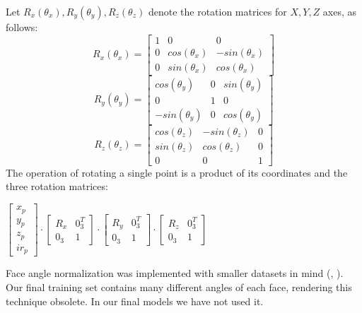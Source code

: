         Let $R_x(\theta_x), R_y(\theta_y), R_z(\theta_z)$ denote the rotation matrices
        for $X, Y, Z$ axes, as follows:
        \[
        R_x(\theta_x) =
        \begin{bmatrix}
        1 & 0 & 0\\
        0 & cos(\theta_x) & -sin(\theta_x)\\
        0 & sin(\theta_x) & cos(\theta_x)
        \end{bmatrix}
        \]
        \[
        R_y(\theta_y) =
        \begin{bmatrix}
        cos(\theta_y) & 0 & sin(\theta_y)\\
        0 & 1 & 0\\
        -sin(\theta_y) & 0 & cos(\theta_y)
        \end{bmatrix}
        \]
        \[
        R_z(\theta_z) =
        \begin{bmatrix}
        cos(\theta_z) & -sin(\theta_z) & 0\\
        sin(\theta_z) & cos(\theta_z) & 0\\
        0 & 0 & 1
        \end{bmatrix}
        \]
        The operation of rotating a single point is a product of its coordinates and the three rotation matrices:
        \begin{center}
        $
        \begin{bmatrix}
          x_p\\
          y_p\\
          z_p\\
          ir_p
        \end{bmatrix}
        \cdot
        \begin{bmatrix}
          R_x & 0_{3}^T\\
          0_{3} & 1
        \end{bmatrix}
        \cdot
        \begin{bmatrix}
          R_y & 0_{3}^T\\
          0_{3} & 1
        \end{bmatrix}
        \cdot
        \begin{bmatrix}
          R_z & 0_{3}^T\\
          0_{3} & 1
        \end{bmatrix}
        $
        \end{center}

        Face angle normalization was implemented with smaller datasets in mind
        (\cite{eurecom}, \cite{vapaaudk}). Our final training set
        contains many different angles of each face, rendering this technique obsolete.
        In our final models we have not used it.

